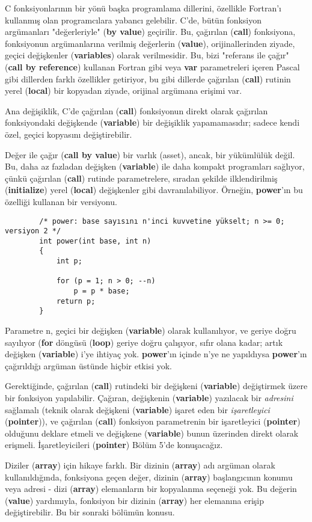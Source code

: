 \documentclass[a4paper,12pt,oneside]{book}
\begin{document}
C fonksiyonlarının bir yönü başka programlama dillerini, özellikle Fortran'ı kullanmış olan programcılara yabancı gelebilir. C'de, bütün fonksiyon argümanları "değerleriyle" (\textbf{by value}) geçirilir. Bu, çağırılan (\textbf{call}) fonksiyona, fonksiyonun argümanlarına verilmiş değerlerin (\textbf{value}), orijinallerinden ziyade, geçici değişkenler (\textbf{variables}) olarak verilmesidir. Bu, bizi "referans ile çağır" (\textbf{call by reference}) kullanan Fortran gibi veya \textbf{var} parametreleri içeren Pascal gibi dillerden farklı özellikler getiriyor, bu gibi dillerde çağırılan (\textbf{call}) rutinin yerel (\textbf{local}) bir kopyadan ziyade, orijinal argümana erişimi var.
\par Ana değişiklik, C'de çağırılan (\textbf{call}) fonksiyonun direkt olarak çağırılan fonksiyondaki değişkende (\textbf{variable}) bir değişiklik yapamamasıdır; sadece kendi özel, geçici kopyasını değiştirebilir.
\par Değer ile çağır (\textbf{call by value}) bir varlık (asset), ancak, bir yükümlülük değil. Bu, daha az fazladan değişken (\textbf{variable}) ile daha kompakt programları sağlıyor, çünkü çağırılan (\textbf{call}) rutinde parametrelere, sıradan şekilde ilklendirilmiş (\textbf{initialize}) yerel (\textbf{local}) değişkenler gibi davranılabiliyor. Örneğin, \textbf{power}'ın bu özelliği kullanan bir versiyonu. \pagebreak
\begin{lstlisting}
		/* power: base sayısını n'inci kuvvetine yükselt; n >= 0; versiyon 2 */
		int power(int base, int n)
		{
			int p;

			for (p = 1; n > 0; --n)
				p = p * base;
			return p;
		}
\end{lstlisting}
Parametre n, geçici bir değişken (\textbf{variable}) olarak kullanılıyor, ve geriye doğru sayılıyor (\textbf{for} döngüsü (\textbf{loop}) geriye doğru çalışıyor, sıfır olana kadar; artık değişken (\textbf{variable}) i'ye ihtiyaç yok. \textbf{power}'ın içinde n'ye ne yapıldıysa \textbf{power}'ın çağırıldığı argüman üstünde hiçbir etkisi yok.
\par Gerektiğinde, çağırılan (\textbf{call}) rutindeki bir değişkeni (\textbf{variable}) değiştirmek üzere bir fonksiyon yapılabilir. Çağıran, değişkenin (\textbf{variable}) yazılacak bir \textit{adresini} sağlamalı (teknik olarak değişkeni (\textbf{variable}) işaret eden bir \textit{işaretleyici} (\textbf{pointer})), ve çağırılan (\textbf{call}) fonksiyon parametrenin bir işaretleyici (\textbf{pointer}) olduğunu deklare etmeli ve değişkene (\textbf{variable}) bunun üzerinden direkt olarak erişmeli. İşaretleyicileri (\textbf{pointer}) Bölüm 5'de konuşacağız.
\par Diziler (\textbf{array}) için hikaye farklı. Bir dizinin (\textbf{array}) adı argüman olarak kullanıldığında, fonksiyona geçen değer, dizinin (\textbf{array}) başlangıcının konumu veya adresi - dizi (\textbf{array}) elemanların bir kopyalanma seçeneği yok. Bu değerin (\textbf{value}) yardımıyla, fonksiyon bir dizinin (\textbf{array}) her elemanına erişip değiştirebilir. Bu bir sonraki bölümün konusu.
\end{document}
